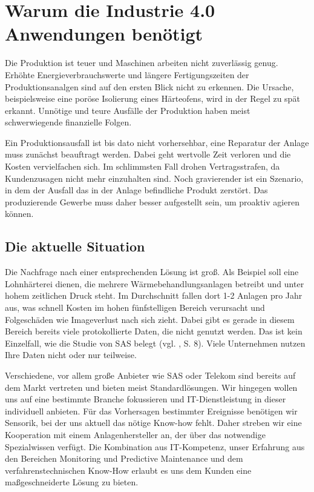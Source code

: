 \newpage
\section{Warum die Industrie 4.0 Anwendungen benötigt}

Die Produktion ist teuer und Maschinen arbeiten nicht zuverlässig genug. Erhöhte Energieverbrauchswerte und längere Fertigungszeiten der Produktionsanalgen sind auf den ersten Blick nicht zu erkennen. Die Ursache, beispielsweise eine poröse Isolierung eines Härteofens, wird in der Regel zu spät erkannt. Unnötige und teure Ausfälle der Produktion haben meist schwerwiegende finanzielle Folgen.

Ein Produktionsausfall ist bis dato nicht vorhersehbar, eine Reparatur der Anlage muss zunächst beauftragt werden. Dabei geht wertvolle Zeit verloren und die Kosten vervielfachen sich. Im schlimmsten Fall drohen Vertragsstrafen, da Kundenzusagen nicht mehr einzuhalten sind. Noch gravierender ist ein Szenario, in dem der Ausfall das in der Anlage befindliche Produkt zerstört. Das produzierende Gewerbe muss daher besser aufgestellt sein, um proaktiv agieren können. 


\subsection{Die aktuelle Situation}
Die Nachfrage nach einer entsprechenden Lösung ist groß. Als Beispiel soll eine Lohnhärterei dienen, die mehrere Wärmebehandlungsanlagen betreibt und unter hohem zeitlichen Druck steht. Im Durchschnitt fallen dort 1-2 Anlagen pro Jahr aus, was schnell Kosten im hohen fünfstelligen Bereich verursacht und Folgeschäden wie Imageverlust nach sich zieht. Dabei gibt es gerade in diesem Bereich bereits viele protokollierte Daten, die nicht genutzt werden. Das ist kein Einzelfall, wie die Studie von SAS belegt (vgl. \cite{SasForsa}, S. 8). Viele Unternehmen nutzen Ihre Daten nicht oder nur teilweise.

Verschiedene, vor allem große Anbieter wie SAS oder Telekom sind bereits auf dem Markt vertreten und bieten meist Standardlösungen. Wir hingegen wollen uns auf eine bestimmte Branche fokussieren und IT-Dienstleistung in dieser individuell anbieten. Für das Vorhersagen bestimmter Ereignisse benötigen wir Sensorik, bei der uns aktuell das nötige Know-how fehlt. Daher streben wir eine Kooperation mit einem Anlagenhersteller an, der über das notwendige Spezialwissen verfügt. Die Kombination aus IT-Kompetenz, unser Erfahrung aus den Bereichen Monitoring und Predictive Maintenance und dem verfahrenstechnischen Know-How erlaubt es uns dem Kunden eine maßgeschneiderte Lösung zu bieten.

